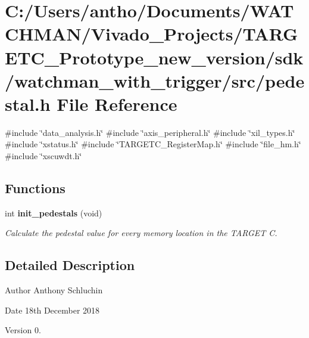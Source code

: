 \section{C\+:/\+Users/antho/\+Documents/\+W\+A\+T\+C\+H\+M\+A\+N/\+Vivado\+\_\+\+Projects/\+T\+A\+R\+G\+E\+T\+C\+\_\+\+Prototype\+\_\+new\+\_\+version/sdk/watchman\+\_\+with\+\_\+trigger/src/pedestal.h File Reference}
\label{pedestal_8h}
{\ttfamily \#include \char`\"{}data\+\_\+analysis.\+h\char`\"{}}\newline
{\ttfamily \#include \char`\"{}axis\+\_\+peripheral.\+h\char`\"{}}\newline
{\ttfamily \#include \char`\"{}xil\+\_\+types.\+h\char`\"{}}\newline
{\ttfamily \#include \char`\"{}xstatus.\+h\char`\"{}}\newline
{\ttfamily \#include \char`\"{}T\+A\+R\+G\+E\+T\+C\+\_\+\+Register\+Map.\+h\char`\"{}}\newline
{\ttfamily \#include \char`\"{}file\+\_\+hm.\+h\char`\"{}}\newline
{\ttfamily \#include \char`\"{}xscuwdt.\+h\char`\"{}}\newline
\subsection*{Functions}
\begin{DoxyCompactItemize}
\item 
int \textbf{ init\+\_\+pedestals} (void)
\begin{DoxyCompactList}\small\item\em Calculate the pedestal value for every memory location in the T\+A\+R\+G\+ET C. \end{DoxyCompactList}\end{DoxyCompactItemize}


\subsection{Detailed Description}
\begin{DoxyAuthor}{Author}
Anthony Schluchin 
\end{DoxyAuthor}
\begin{DoxyDate}{Date}
18th December 2018 
\end{DoxyDate}
\begin{DoxyVersion}{Version}
0. 
\end{DoxyVersion}


